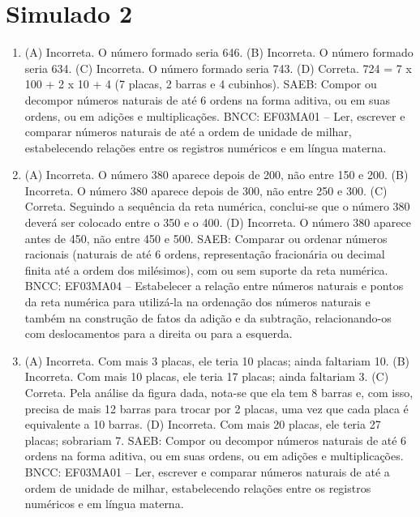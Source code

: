 \section*{Simulado 2}

\begin{enumerate}
\item
(A) Incorreta. O número formado seria 646.
(B) Incorreta. O número formado seria 634.
(C) Incorreta. O número formado seria 743.
(D) Correta. 724 = 7 x 100 + 2 x 10 + 4 (7 placas, 2 barras e 4 cubinhos).
SAEB: Compor ou decompor números naturais de até 6 ordens na forma aditiva, ou em suas ordens, ou em adições e multiplicações.
BNCC: EF03MA01 -- Ler, escrever e comparar números naturais de até a ordem de unidade de milhar, estabelecendo relações entre os registros numéricos e em língua materna.

\item 
(A) Incorreta. O número 380 aparece depois de 200, não entre 150 e 200.
(B) Incorreta. O número 380 aparece depois de 300, não entre 250 e 300.
(C) Correta. Seguindo a sequência da reta numérica, conclui-se que o número 380 deverá ser colocado entre o 350 e o 400.
(D) Incorreta. O número 380 aparece antes de 450, não entre 450 e 500.
SAEB: Comparar ou ordenar números racionais (naturais de até 6 ordens, representação fracionária ou decimal finita até a ordem dos milésimos), com ou sem suporte da reta numérica.
BNCC: EF03MA04 -- Estabelecer a relação entre números naturais e pontos da reta numérica para
utilizá-la na ordenação dos números naturais e também na construção de fatos da adição e da
subtração, relacionando-os com deslocamentos para a direita ou para a esquerda.

\item
(A) Incorreta. Com mais 3 placas, ele teria 10 placas; ainda faltariam 10.
(B) Incorreta. Com mais 10 placas, ele teria 17 placas; ainda faltariam 3.
(C) Correta. Pela análise da figura dada, nota-se que ela tem 8 barras e, com isso,
precisa de mais 12 barras para trocar por 2 placas, uma vez que cada placa é equivalente a 10 barras.
(D) Incorreta. Com mais 20 placas, ele teria 27 placas; sobrariam 7.
SAEB: Compor ou decompor números naturais de até 6 ordens na forma aditiva, ou em suas ordens, ou em adições e multiplicações.
BNCC: EF03MA01 -- Ler, escrever e comparar números naturais de até a ordem de unidade de milhar, estabelecendo relações entre os registros numéricos e em língua materna.


\end{enumerate}
